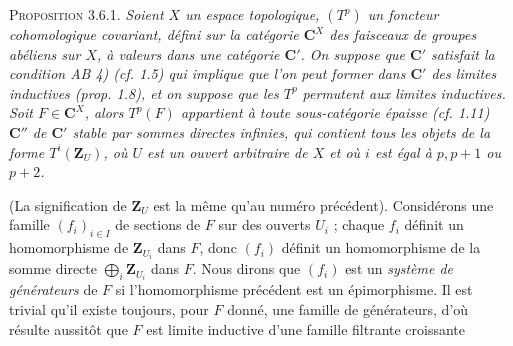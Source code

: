 \indent\textsc{Proposition 3.6.1.} \textit{Soient $X$ un espace
topologique, $(T^p)$ un foncteur cohomologique covariant, défini sur la
catégorie $\mathbf C^X$ des faisceaux de groupes abéliens sur $X$, à valeurs dans une
catégorie $\mathbf C'$. On suppose que $\mathbf C'$ satisfait la condition \textup{AB 4)} \textup{(}cf. \textup{1.5)} qui
implique que l'on peut former dans $\mathbf C'$ des limites inductives \textup{(}prop. \textup{1.8)}, et
on suppose que les $T^p$ permutent aux limites inductives. Soit $F\in \mathbf C^X$,
alors $T^p(F)$ appartient à toute sous-catégorie épaisse \textup{(}cf. \textup{1.11)} $\mathbf C''$ de
$\mathbf C'$ stable par sommes directes infinies, qui contient tous les objets de la
forme $T^i(\mathbf Z_U)$, où $U$ est un ouvert arbitraire de $X$ et où $i$ est égal à
$p,p+1$ ou $p+2$.}

(La signification de $\mathbf Z_U$ est la même qu'au numéro précédent).
Considérons une famille $(f_i)_{i\in I}$ de sections de $F$ sur des ouverts
$U_i$ ; chaque $f_i$ définit un homomorphisme de $\mathbf Z_{U_i}$ dans $F$, donc
$(f_i)$ définit un homomorphisme de la
somme directe $\displaystyle\bigoplus_i \mathbf Z_{U_i}$ dans $F$.
Nous dirons que $(f_i)$ est un \textit{système de générateurs} de $F$ si
l'homomorphisme précédent est un épimorphisme. Il est trivial qu'il existe
toujours, pour $F$ donné, une famille de générateurs, d'où résulte aussitôt que
$F$ est limite inductive d'une famille filtrante croissante

